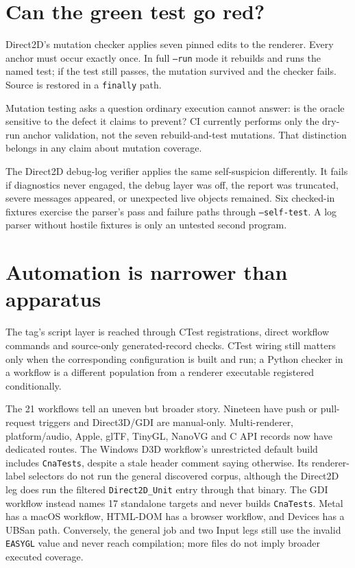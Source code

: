\section{Can the green test go red?}

Direct2D's mutation checker applies seven pinned edits to the renderer.  Every anchor must occur
exactly once.  In full \texttt{--run} mode it rebuilds and runs the named test; if the test still
passes, the mutation survived and the checker fails.  Source is restored in a \texttt{finally}
path.

Mutation testing asks a question ordinary execution cannot answer: is the oracle sensitive to
the defect it claims to prevent?  CI currently performs only the dry-run anchor validation, not
the seven rebuild-and-test mutations.  That distinction belongs in any claim about mutation
coverage.

The Direct2D debug-log verifier applies the same self-suspicion differently.  It fails if
diagnostics never engaged, the debug layer was off, the report was truncated, severe messages
appeared, or unexpected live objects remained.  Six checked-in fixtures exercise the parser's
pass and failure paths through \texttt{--self-test}.  A log parser without hostile fixtures is
only an untested second program.

\section{Automation is narrower than apparatus}

The tag's script layer is reached through CTest registrations, direct workflow commands and
source-only generated-record checks.  CTest wiring still matters only when the corresponding
configuration is built and run; a Python checker in a workflow is a different population from a
renderer executable registered conditionally.

The 21 workflows tell an uneven but broader story.  Nineteen have push or pull-request triggers
and Direct3D/GDI are manual-only.  Multi-renderer, platform/audio, Apple, glTF, TinyGL, NanoVG and
C API records now have dedicated routes.  The Windows D3D workflow's unrestricted default build includes \texttt{CnaTests},
despite a stale header comment saying otherwise.  Its renderer-label selectors do not run the
general discovered corpus, although the Direct2D leg does run the filtered
\texttt{Direct2D\_Unit} entry through that binary.  The GDI workflow instead names 17 standalone
targets and never builds \texttt{CnaTests}.  Metal has a macOS workflow, HTML-DOM has a browser
workflow, and Devices has a UBSan path.  Conversely, the general job and two Input legs still use
the invalid \texttt{EASYGL} value and never reach compilation; more files do not imply broader
executed coverage.

